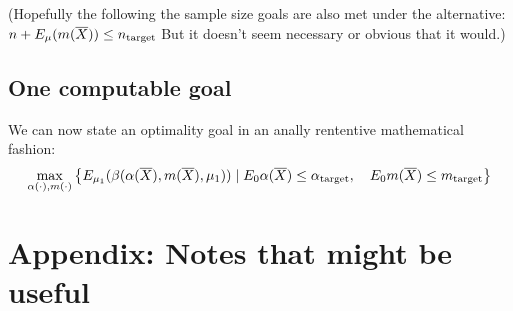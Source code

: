 \documentclass{article}
\newcommand{\target}{{\hbox{\scriptsize target}}}
\begin{document}
(Hopefully the following the sample size goals are also met under the
alternative: $ n + E_\mu(m(\overline{X})) \le n_\target $ But it
doesn't seem necessary or obvious that it would.)


\subsection{One computable goal}

We can now state an optimality goal in an anally rententive
mathematical fashion:
\begin{equation}
\label{eq:goal}
\max_{\alpha(\cdot),m(\cdot)}\left\{
E_{\mu_1}(\beta(\alpha(\overline{X}),m(\overline{X}),\mu_1)) \mid
E_0 \alpha(\overline{X}) \le \alpha_\target, \quad E_0
m(\overline{X}) \le m_\target \right\}
\end{equation}


\newpage
\section*{Appendix: Notes that might be useful}
\end{document}
